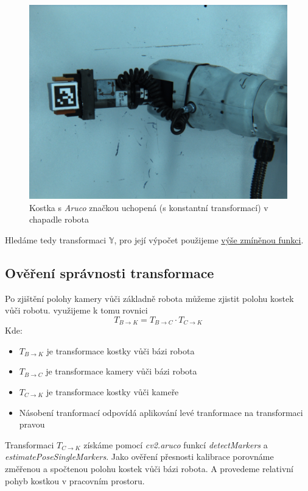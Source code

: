 \documentclass[journal,twoside,web]{ieeecolor}
\begin{document}
            \begin{figure}[h!]
                \centering
                \includegraphics[width=0.8\linewidth]{images/Hand2eye.png}
                \caption{Kostka s \textit{Aruco} značkou uchopená (s konstantní transformací) v chapadle robota}
                \label{fig:ArucoInHand}
            \end{figure}
            Hledáme tedy transformaci $\mathbb{Y}$, pro její výpočet použijeme \hyperlink{cv2Handeye}{výše zmíněnou funkci}.

            \subsection{Ověření správnosti transformace}
                Po zjištění polohy kamery vůči základně robota můžeme zjistit polohu kostek vůči robotu. využijeme
                k tomu rovnici
                \begin{equation}
                    T_{B\rightarrow K} = T_{B\rightarrow C} \cdot T_{C \rightarrow K}
                \end{equation}
                Kde:
            \begin{itemize}
                \item $T_{B\rightarrow K}$ je transformace kostky vůči bázi robota\\
                \item $T_{B\rightarrow C}$ je transformace kamery vůči bázi robota\\
                \item $T_{C\rightarrow K}$ je transformace kostky vůči kameře\\
                \item Násobení tranformací odpovídá aplikování levé tranformace na transformaci pravou
            \end{itemize}
            Transformaci $T_{C\rightarrow K}$ získáme pomocí \textit{cv2.aruco} funkcí \textit{detectMarkers} a 
            \textit{estimatePoseSingleMarkers}. Jako ověření přesnosti kalibrace porovnáme změřenou a spočtenou
            polohu kostek vůči bázi robota. A provedeme relativní pohyb kostkou v pracovním prostoru.
\end{document}
